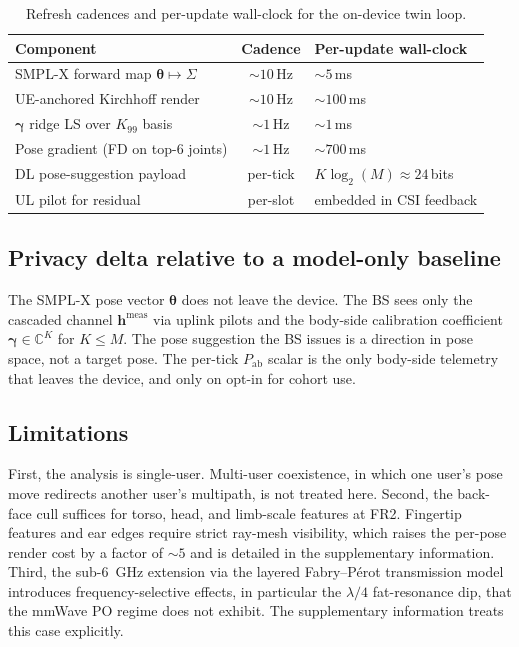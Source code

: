\documentclass[journal,twocolumn,10pt]{IEEEtran}
\theoremstyle{plain}
\theoremstyle{definition}
\theoremstyle{remark}
\newcommand{\hh}{\bm{h}}
\newcommand{\Pabs}{P_{\mathrm{ab}}}
\newcommand{\thetab}{\bm{\theta}}
\newcommand{\gammab}{\bm{\gamma}}
\newcommand{\Complex}{\mathbb{C}}
\begin{document}
\begin{table}[!t]
\caption{Refresh cadences and per-update wall-clock for the
on-device twin loop.}
\label{tab:cadence}
\centering\scriptsize
\begin{tabular}{@{}p{} c p{}@{}}
\toprule
Component & Cadence & Per-update wall-clock \\
\midrule
SMPL-X forward map $\thetab \mapsto \Sigma$ & $\sim\!10\,$Hz & $\sim\!5\,$ms \\
UE-anchored Kirchhoff render & $\sim\!10\,$Hz & $\sim\!100\,$ms \\
$\bm{\gamma}$ ridge LS over $K_{99}$ basis & $\sim\!1\,$Hz & $\sim\!1\,$ms \\
Pose gradient (FD on top-6 joints) & $\sim\!1\,$Hz & $\sim\!700\,$ms \\
DL pose-suggestion payload & per-tick & $K \log_2(M) \approx 24\,$bits \\
UL pilot for residual & per-slot & embedded in CSI feedback \\
\bottomrule
\end{tabular}
\end{table}

\subsection{Privacy delta relative to a model-only baseline}

The SMPL-X pose vector $\thetab$ does not leave the device. The
BS sees only the cascaded channel $\hh^{\mathrm{meas}}$ via
uplink pilots and the body-side calibration coefficient
$\gammab\in\Complex^{K}$ for $K\leq M$. The pose suggestion the
BS issues is a direction in pose space, not a target pose. The
per-tick $\Pabs$ scalar is the only body-side telemetry that
leaves the device, and only on opt-in for cohort use.

\subsection{Limitations}

First, the analysis is single-user. Multi-user coexistence, in
which one user's pose move redirects another user's multipath,
is not treated here.
Second, the back-face cull suffices for torso, head, and
limb-scale features at FR2. Fingertip features and ear edges
require strict ray-mesh visibility, which raises the per-pose
render cost by a factor of $\sim\!5$ and is detailed in the
supplementary information.
Third, the sub-6~GHz extension via the layered Fabry--P\'erot
transmission model introduces frequency-selective effects, in
particular the $\lambda/4$ fat-resonance dip, that the mmWave PO
regime does not exhibit. The supplementary information treats
this case explicitly.
\end{document}
